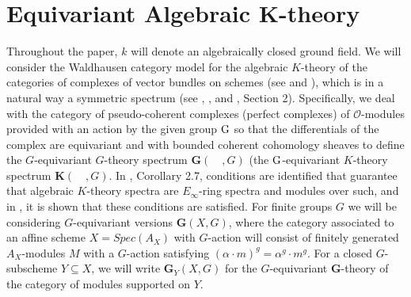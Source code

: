 \documentclass[11pt]{article}
\def \bG{\mathbf G}
\def \rmG{\rm G}
\def \bK{\mathbf K}
\def \O{\mathcal O}
\newcommand\mfk{\mathbf G}
\begin{document}
 

\section{Equivariant Algebraic  K-theory } \label{equivariantk}
Throughout the paper,  $k$ will denote an algebraically closed ground field.  We will consider the Waldhausen category model  for the algebraic $K$-theory of the categories of complexes of vector bundles  on schemes (see \cite{waldhausen} and \cite{TT}), which is in a natural way a symmetric spectrum (see \cite{symmetric}, \cite{geisser}, and \cite{blumberg}, Section 2). Specifically, we deal with the category of pseudo-coherent complexes (perfect complexes) of $\O$-modules provided with an action by the given
group $\rmG$ so that the differentials of the complex are equivariant and with bounded coherent cohomology
sheaves to define the $G$-equivariant $G$-theory spectrum $\bG(\quad, G)$ (the $\rmG$-equivariant $K$-theory spectrum $\bK(\quad, G)$.    In \cite{blumberg}, Corollary 2.7, conditions are identified that guarantee that algebraic $K$-theory spectra are $E_{\infty}$-ring spectra and modules over such, and in \cite{zakharevich}, it is shown that these conditions are satisfied.    For finite groups $G$  we  will be considering $G$-equivariant versions $\mfk(X, G) $, where the category associated to an affine  scheme $X = Spec(A_X)$  with $G$-action will consist of finitely generated $A_X$-modules $M$ with a $G$-action satisfying $ (\alpha \cdot m)^g = \alpha^g \cdot m^g$. For a closed $G$-subscheme $Y \subseteq X$, we will write
$\mfk_Y(X, G)$ for the $G$-equivariant $\mfk$-theory of the category of modules supported on $Y$.  
\end{document}
